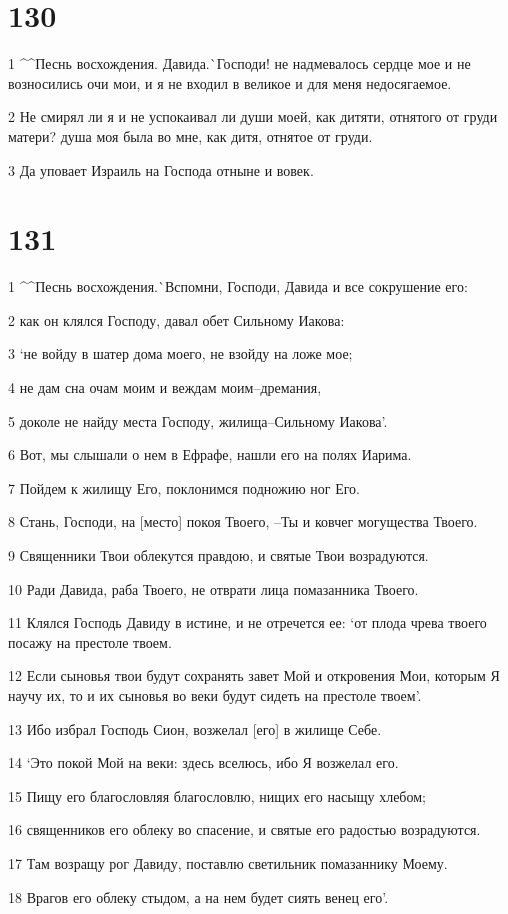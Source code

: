 \chapter{130}

\par 1 ^^Песнь восхождения. Давида.^^ Господи! не надмевалось сердце мое и не возносились очи мои, и я не входил в великое и для меня недосягаемое.
\par 2 Не смирял ли я и не успокаивал ли души моей, как дитяти, отнятого от груди матери? душа моя была во мне, как дитя, отнятое от груди.
\par 3 Да уповает Израиль на Господа отныне и вовек.

\chapter{131}

\par 1 ^^Песнь восхождения.^^ Вспомни, Господи, Давида и все сокрушение его:
\par 2 как он клялся Господу, давал обет Сильному Иакова:
\par 3 `не войду в шатер дома моего, не взойду на ложе мое;
\par 4 не дам сна очам моим и веждам моим--дремания,
\par 5 доколе не найду места Господу, жилища--Сильному Иакова'.
\par 6 Вот, мы слышали о нем в Ефрафе, нашли его на полях Иарима.
\par 7 Пойдем к жилищу Его, поклонимся подножию ног Его.
\par 8 Стань, Господи, на [место] покоя Твоего, --Ты и ковчег могущества Твоего.
\par 9 Священники Твои облекутся правдою, и святые Твои возрадуются.
\par 10 Ради Давида, раба Твоего, не отврати лица помазанника Твоего.
\par 11 Клялся Господь Давиду в истине, и не отречется ее: `от плода чрева твоего посажу на престоле твоем.
\par 12 Если сыновья твои будут сохранять завет Мой и откровения Мои, которым Я научу их, то и их сыновья во веки будут сидеть на престоле твоем'.
\par 13 Ибо избрал Господь Сион, возжелал [его] в жилище Себе.
\par 14 `Это покой Мой на веки: здесь вселюсь, ибо Я возжелал его.
\par 15 Пищу его благословляя благословлю, нищих его насыщу хлебом;
\par 16 священников его облеку во спасение, и святые его радостью возрадуются.
\par 17 Там возращу рог Давиду, поставлю светильник помазаннику Моему.
\par 18 Врагов его облеку стыдом, а на нем будет сиять венец его'.

